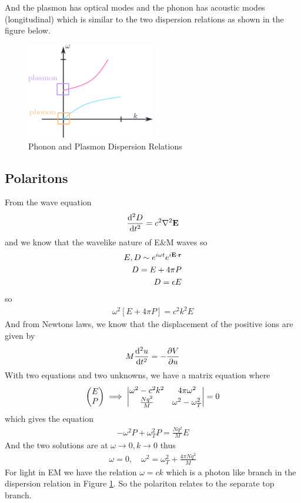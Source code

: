 \documentclass[../main.tex]{subfiles}
\begin{document}
And the plasmon has optical modes and the phonon has acoustic modes (longitudinal) which is
similar to the two dispersion relations as shown in the figure below.
\begin{figure}[ht]
    \centering
    \includegraphics[width=0.5\textwidth]{plasmon_phonon.png}
    \caption{Phonon and Plasmon Dispersion Relations}
    \label{fig:phononplasmon}
\end{figure}

\subsection*{Polaritons}
From the wave equation
\begin{align*}
    \dv[2]{D}{t} = c^2 \laplacian \vb E
\end{align*}
and we know that the wavelike nature of E\&M waves so
\begin{align*}
    E,D \sim e^{i\omega t} e^{i\vb E \cdot \vb r} \\
    D = E + 4\pi P \\
    D = \epsilon E
\end{align*}
so
\begin{align*}
    \omega^2 [E + 4\pi P] = c^2 k^2 E
\end{align*}
And from Newtons laws, we know that the displacement of the positive ions are given by
\begin{align*}
    M \dv[2]{u}{t} = -\pdv{V}{u}
\end{align*}
With two equations and two unknowns, we have a matrix equation where
\begin{align*}
    \mqty(E \\ P) \implies \begin{vmatrix}
        \omega^2 - c^2 k^2 & 4\pi \omega^2 \\
        \frac{Nq^2}{M} & \omega^2 - \omega_T^2
    \end{vmatrix}
    = 0
\end{align*}
which gives the equation
\begin{align*}
    -\omega^2 P + \omega_T^2 P = \frac{Nq^2}{M} E
\end{align*}
And the two solutions are at $\omega \to 0, k \to 0$ thus
\begin{align*}
    \omega = 0, \quad \omega^2 = \omega_T^2 + \frac{4\pi N q^2}{M}
\end{align*}
For light in EM we have the relation $\omega = ck$ which is a photon like branch in the dispersion
relation in Figure \ref{fig:phononplasmon}. So the polariton relates to the separate top branch. 
\end{document}
